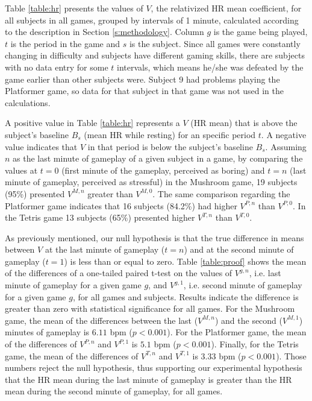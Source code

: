 Table \ref{table:hr} presents the values of $V$, the relativized HR mean coefficient, for all subjects in all games, grouped by intervals of 1 minute, calculated according to the description in Section \ref{s:methodology}. Column $g$ is the game being played, $t$ is the period in the game and $s$ is the subject. Since all games were constantly changing in difficulty and subjects have different gaming skills, there are subjects with no data entry for some $t$ intervals, which means he/she was defeated by the game earlier than other subjects were. Subject 9 had problems playing the Platformer game, so data for that subject in that game was not used in the calculations.

A positive value in Table \ref{table:hr} represents a $V$ (HR mean) that is above the subject's baseline $B_s$ (mean HR while resting) for an specific period $t$. A negative value indicates that $V$ in that period is below the subject's baseline $B_s$. Assuming $n$ as the last minute of gameplay of a given subject in a game, by comparing the values at $t=0$ (first minute of the gameplay, perceived as boring) and $t=n$ (last minute of gameplay, perceived as stressful) in the Mushroom game, 19 subjects (95\%) presented $V^{M,n}$ greater than $V^{M,0}$. The same comparison regarding the Platformer game indicates that 16 subjects (84.2\%) had higher $V^{P,n}$ than $V^{P,0}$. In the Tetris game 13 subjects (65\%) presented higher $V^{T,n}$ than $V^{T,0}$.

As previously mentioned, our null hypothesis is that the true difference in means between $V$ at the last minute of gameplay ($t=n$) and at the second minute of gameplay ($t=1$) is less than or equal to zero. Table \ref{table:proof} shows the mean of the differences of a one-tailed paired t-test on the values of $V^{g,n}$, i.e. last minute of gameplay for a given game $g$, and $V^{g,1}$, i.e. second minute of gameplay for a given game $g$, for all games and subjects. Results indicate the difference is greater than zero with statistical significance for all games. For the Mushroom game, the mean of the differences between the last ($V^{M,n}$) and the second ($V^{M,1}$) minutes of gameplay is $6.11$ bpm ($p < 0.001$). For the Platformer game, the mean of the differences of $V^{P,n}$ and $V^{P,1}$ is $5.1$ bpm ($p < 0.001$). Finally, for the Tetris game, the mean of the differences of $V^{T,n}$ and $V^{T,1}$ is $3.33$ bpm ($p < 0.001$). Those numbers reject the null hypothesis, thus supporting our experimental hypothesis that the HR mean during the last minute of gameplay is greater than the HR mean during the second minute of gameplay, for all games.

